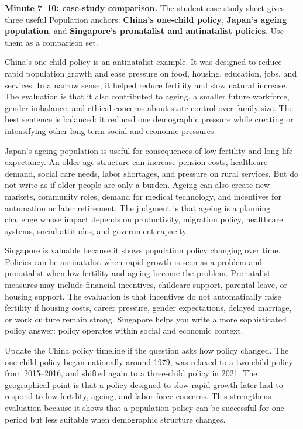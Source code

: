 \documentclass[11pt,a4paper]{article}
\newcommand{\term}[1]{\textcolor{HeadingBlue}{\textbf{#1}}}
\begin{document}
\textbf{Minute 7--10: case-study comparison.}
The student case-study sheet gives three useful Population anchors:
\term{China's one-child policy}, \term{Japan's ageing population}, and
\term{Singapore's pronatalist and antinatalist policies}. Use them as a
comparison set.

China's one-child policy is an antinatalist example. It was designed to reduce
rapid population growth and ease pressure on food, housing, education, jobs, and
services. In a narrow sense, it helped reduce fertility and slow natural
increase. The evaluation is that it also contributed to ageing, a smaller future
workforce, gender imbalance, and ethical concerns about state control over
family size. The best sentence is balanced: it reduced one demographic pressure
while creating or intensifying other long-term social and economic pressures.

Japan's ageing population is useful for consequences of low fertility and long
life expectancy. An older age structure can increase pension costs, healthcare
demand, social care needs, labor shortages, and pressure on rural services. But
do not write as if older people are only a burden. Ageing can also create new
markets, community roles, demand for medical technology, and incentives for
automation or later retirement. The judgment is that ageing is a planning
challenge whose impact depends on productivity, migration policy, healthcare
systems, social attitudes, and government capacity.

Singapore is valuable because it shows population policy changing over time.
Policies can be antinatalist when rapid growth is seen as a problem and
pronatalist when low fertility and ageing become the problem. Pronatalist
measures may include financial incentives, childcare support, parental leave, or
housing support. The evaluation is that incentives do not automatically raise
fertility if housing costs, career pressure, gender expectations, delayed
marriage, or work culture remain strong. Singapore helps you write a more
sophisticated policy answer: policy operates within social and economic context.

Update the China policy timeline if the question asks how policy changed. The
one-child policy began nationally around 1979, was relaxed to a two-child policy
from 2015--2016, and shifted again to a three-child policy in 2021. The
geographical point is that a policy designed to slow rapid growth later had to
respond to low fertility, ageing, and labor-force concerns. This strengthens
evaluation because it shows that a population policy can be successful for one
period but less suitable when demographic structure changes.
\end{document}
